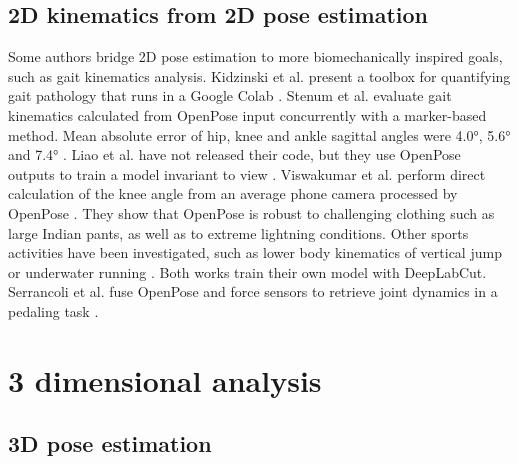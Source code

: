 \subsection{2D kinematics from 2D pose estimation}

Some authors bridge 2D pose estimation to more biomechanically inspired goals, such as gait kinematics analysis. Kidzinski et al. present a toolbox for quantifying gait pathology that runs in a Google Colab \cite{Kidziński2020}. Stenum et al. evaluate gait kinematics calculated from OpenPose input concurrently with a marker-based method. Mean absolute error of hip, knee and ankle sagittal angles were 4.0°, 5.6° and 7.4° \cite{Stenum2021}. Liao et al. have not released their code, but they use OpenPose outputs to train a model invariant to view \cite{Liao2020}. Viswakumar et al. perform direct calculation of the knee angle from an average phone camera processed by OpenPose \cite{Viswakumar2019}. They show that OpenPose is robust to challenging clothing such as large Indian pants, as well as to extreme lightning conditions. Other sports activities have been investigated, such as lower body kinematics of vertical jump \cite{Drazan2021} or underwater running \cite{Cronin2019}. Both works train their own model with DeepLabCut. Serrancoli et al. fuse OpenPose and force sensors to retrieve joint dynamics in a pedaling task \cite{Serrancolí2020}. 


\section{3 dimensional analysis}

\subsection{3D pose estimation}

